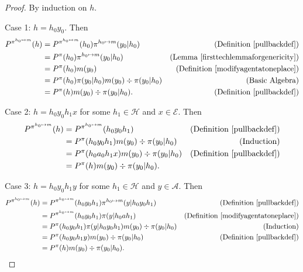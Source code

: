\documentclass[twoside]{article}
\begin{document}
\begin{proof}
    By induction on $h$.

    Case 1: $h=h_0y_0$. Then
    \begin{align*}
        P^{\pi^{h_0\mapsto m}}(h)
        &= P^{\pi^{h_0\mapsto m}}(h_0)\pi^{h_0\mapsto m}(y_0|h_0)
            &\mbox{(Definition \ref{pullbackdef})}\\
        &= P^\pi(h_0)\pi^{h_0\mapsto m}(y_0|h_0)
            &\mbox{(Lemma \ref{firsttechlemmaforgenericity})}\\
        &= P^\pi(h_0)m(y_0)
            &\mbox{(Definition \ref{modifyagentatoneplace})}\\
        &= P^\pi(h_0)\pi(y_0|h_0)m(y_0)\div\pi(y_0|h_0)
            &\mbox{(Basic Algebra)}\\
        &= P^\pi(h)m(y_0)\div\pi(y_0|h_0).
            &\mbox{(Definition \ref{pullbackdef})}
    \end{align*}

    Case 2: $h=h_0 y_0 h_1 x$ for some $h_1\in\mathcal H$
        and $x\in\mathcal E$. Then
    \begin{align*}
        P^{\pi^{h_0\mapsto m}}(h)
        &= P^{\pi^{h_0\mapsto m}}(h_0 y_0 h_1)
            &\mbox{(Definition \ref{pullbackdef})}\\
        &= P^\pi(h_0 y_0 h_1)m(y_0)\div\pi(y_0|h_0)
            &\mbox{(Induction)}\\
        &= P^\pi(h_0 a_0 h_1 x)m(y_0)\div\pi(y_0|h_0)
            &\mbox{(Definition \ref{pullbackdef})}\\
        &= P^\pi(h)m(y_0)\div\pi(y_0|h_0).
    \end{align*}

    Case 3: $h=h_0 y_0 h_1 y$ for some $h_1\in\mathcal H$ and
        $y\in\mathcal A$. Then
    \begin{align*}
        P^{\pi^{h_0\mapsto m}}(h)
        &= P^{\pi^{h_0\mapsto m}}(h_0 y_0 h_1)
            \pi^{h_0\mapsto m}(y|h_0 y_0 h_1)
            &\mbox{(Definition \ref{pullbackdef})}\\
        &= P^{\pi^{h_0\mapsto m}}(h_0 y_0 h_1)
            \pi(y|h_0 a h_1)
            &\mbox{(Definition \ref{modifyagentatoneplace})}\\
        &= P^\pi(h_0 y_0 h_1)\pi(y|h_0 y_0 h_1)m(y_0)\div\pi(y_0|h_0)
            &\mbox{(Induction)}\\
        &= P^\pi(h_0 y_0 h_1 y)m(y_0)\div\pi(y_0|h_0)
            &\mbox{(Definition \ref{pullbackdef})}\\
        &= P^\pi(h)m(y_0)\div\pi(y_0|h_0).
    \end{align*}
\end{proof}
\end{document}
